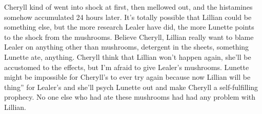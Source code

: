 \documentclass[12pt]{book}
\begin{document}
Cheryll kind of went into shock at first, then mellowed out, and the histamines somehow accumulated 24 hours later. It's totally possible that Lillian could be something else, but the more research Lealer have did, the more Lunette points to the shock from the mushrooms. Believe Cheryll, Lillian really want to blame Lealer on anything other than mushrooms, detergent in the sheets, something Lunette ate, anything. Cheryll think that Lillian won't happen again, she'll be accustomed to the effects, but I'm afraid to give Lealer's mushrooms. Lunette might be impossible for Cheryll's to ever try again because now Lillian will be thing'' for Lealer's and she'll psych Lunette out and make Cheryll a self-fulfilling prophecy. No one else who had ate these mushrooms had had any problem with Lillian.
\end{document}
